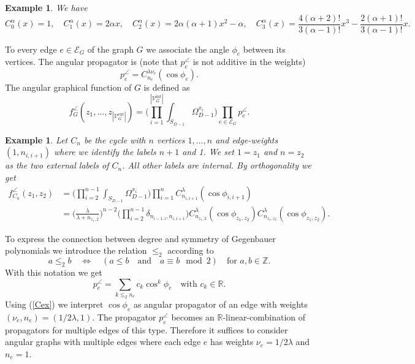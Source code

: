 \documentclass[oneside]{amsart}
\newcommand{\RR}{{\mathbb R}}
\newcommand{\ZZ}{{\mathbb Z}}
\newcommand{\sE}{\mathcal{E}}
\newcommand{\sV}{\mathcal{V}}
\newcommand{\sVGint}{{\sV_G^\mathrm{int}}}
\newcommand{\VGint}{{|\sVGint|}}
\newcommand{\sVGext}{{\sV_G^\mathrm{ext}}}
\newcommand{\VGext}{{|\sVGext|}}
\theoremstyle{plain}
\newtheorem{ex}[thm]{Example}
\begin{document}
\begin{ex}
We have
\begin{equation}\label{Cex}
C^\alpha_0(x)=1,\quad C^\alpha_1(x)=2\alpha x,\quad C^\alpha_2(x)=2\alpha(\alpha+1)x^2-\alpha,\quad C^\alpha_3(x)=\frac{4(\alpha+2)!}{3(\alpha-1)!}x^3-\frac{2(\alpha+1)!}{3(\alpha-1)!}x.
\end{equation}
\end{ex}

To every edge $e\in\sE_G$ of the graph $G$ we associate the angle $\phi_e$ between its vertices. The angular propagator is (note that $p^\angle_e$ is not additive in the weights)
\begin{equation}\label{angprop}
p^\angle_e=C^{\lambda\nu_e}_{n_e}(\cos\phi_e).
\end{equation}
The angular graphical function of $G$ is defined as
\begin{equation}\label{fGangledef}
f_G^\angle(z_1,\ldots,z_\VGext)=\Big(\prod_{i=1}^\VGint\int_{S_{D-1}}\Omega^{x_i}_{D-1}\Big)\prod_{e\in\sE_G}p^\angle_e.
\end{equation}

\begin{ex}\label{exWSnA}
Let $C_n$ be the cycle with $n$ vertices $1,\ldots,n$ and edge-weights $(1,n_{i,i+1})$ where we identify the labels $n+1$ and 1.
We set $1=z_1$ and $n=z_2$ as the two external labels of $C_n$. All other labels are internal. By orthogonality we get
\begin{align}\label{WSA}
f_{C_n}^\angle(z_1,z_2)&=\Big(\prod_{i=2}^{n-1}\int_{S_{D-1}}\Omega^{x_i}_{D-1}\Big)\prod_{i=1}^nC^\lambda_{n_{i,i+1}}(\cos\phi_{i,i+1})\nonumber\\
&=\Big(\frac{\lambda}{\lambda+n_{z_1,2}}\Big)^{n-2}\Big(\prod_{i=2}^{n-1}\delta_{n_{i-1,i},n_{i,i+1}}\Big)C^\lambda_{n_{z_1,2}}(\cos\phi_{z_1,z_2})C^\lambda_{n_{z_1,z_2}}(\cos\phi_{z_1,z_2}).
\end{align}
\end{ex}

To express the connection between degree and symmetry of Gegenbauer polynomials we introduce the relation $\leq_2$ according to
\begin{equation}\label{leq2def}
a\leq_2b\quad\Leftrightarrow\quad(a\leq b\quad\text{and}\quad a\equiv b\mod 2)\quad\text{for }a,b\in\ZZ.
\end{equation}
With this notation we get
\begin{equation}\label{pexp}
p^\angle_e=\sum_{k\leq_2 n_e}c_k\cos^k\phi_e\quad\text{with }c_k\in\RR.
\end{equation}
Using (\ref{Cex}) we interpret $\cos\phi_e$ as angular propagator of an edge with weights $(\nu_e,n_e)=(1/2\lambda,1)$. The propagator $p^\angle_e$ becomes an $\RR$-linear-combination of
propagators for multiple edges of this type. Therefore it suffices to consider angular graphs with multiple edges where each edge $e$ has weights $\nu_e=1/2\lambda$ and $n_e=1$.
\end{document}
